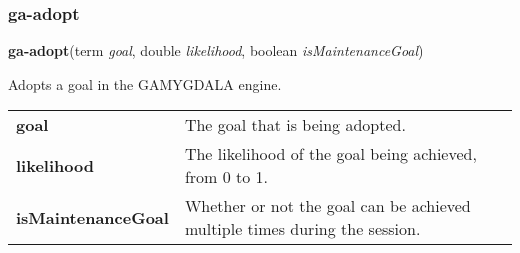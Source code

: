 \subsubsection{ga-adopt}

\textbf{ga-adopt}(term \emph{goal}, double \emph{likelihood}, boolean \emph{isMaintenanceGoal})\vspace{.5em}

\hspace{-\parindent}Adopts a goal in the GAMYGDALA engine.\\[.4em]

\noindent
\begin{tabularx}{\textwidth}{@{}p{4cm} X}
	\textbf{goal} & The goal that is being adopted.\\
	\textbf{likelihood} & The likelihood of the goal being achieved, from 0 to 1.\\
	\textbf{isMaintenanceGoal} & Whether or not the goal can be achieved  multiple times during the session.\\
\end{tabularx}